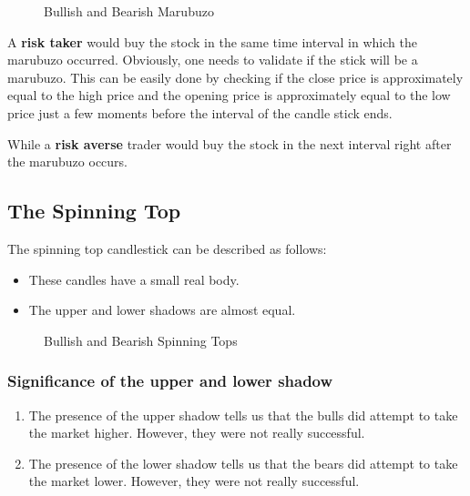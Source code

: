 \begin{figure}[h]
  \centering

  \caption{Bullish and Bearish Marubuzo}
\end{figure}

A \textbf{risk taker} would buy the stock in the same time interval in which the marubuzo occurred. Obviously, one needs to validate if the stick will be a marubuzo. This can be easily done by checking if the close price is approximately equal to the high price and the opening price is approximately equal to the low price just a few moments before the interval of the candle stick ends.

While a \textbf{risk averse} trader would buy the stock in the next interval right after the marubuzo occurs.

\newpage

\subsection{The Spinning Top}
The spinning top candlestick can be described as follows:
\begin{itemize}
  \item These candles have a small real body.
  \item The upper and lower shadows are almost equal.
\end{itemize}

\begin{figure}[h]
  \centering

  \caption{Bullish and Bearish Spinning Tops}
\end{figure}

\subsubsection{Significance of the upper and lower shadow}
\begin{enumerate}
  \item The presence of the upper shadow tells us that the bulls did attempt to take the market higher. However, they were not really successful.
  \item The presence of the lower shadow tells us that the bears did attempt to take the market lower. However, they were not really successful.
\end{enumerate}

